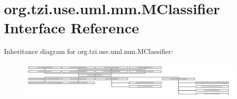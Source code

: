 \hypertarget{interfaceorg_1_1tzi_1_1use_1_1uml_1_1mm_1_1_m_classifier}{\section{org.\-tzi.\-use.\-uml.\-mm.\-M\-Classifier Interface Reference}
\label{interfaceorg_1_1tzi_1_1use_1_1uml_1_1mm_1_1_m_classifier}
}
Inheritance diagram for org.\-tzi.\-use.\-uml.\-mm.\-M\-Classifier\-:\begin{figure}[H]
\begin{center}
\leavevmode
\includegraphics[height=1.919452cm]{interfaceorg_1_1tzi_1_1use_1_1uml_1_1mm_1_1_m_classifier}
\end{center}
\end{figure}
